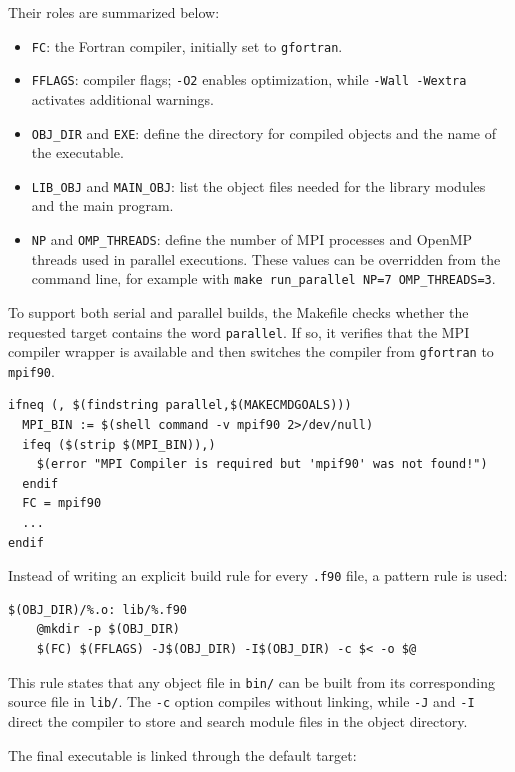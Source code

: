 Their roles are summarized below:

\begin{itemize}
  \item \texttt{FC}: the Fortran compiler, initially set to \texttt{gfortran}.
  \item \texttt{FFLAGS}: compiler flags; \texttt{-O2} enables optimization, while \texttt{-Wall -Wextra} activates additional warnings.
  \item \texttt{OBJ\_DIR} and \texttt{EXE}: define the directory for compiled objects and the name of the executable.
  \item \texttt{LIB\_OBJ} and \texttt{MAIN\_OBJ}: list the object files needed for the library modules and the main program.
  \item \texttt{NP} and \texttt{OMP\_THREADS}: define the number of MPI processes and OpenMP threads used in parallel executions. These values can be overridden from the command line, for example with \texttt{make run\_parallel NP=7 OMP\_THREADS=3}.
\end{itemize}

To support both serial and parallel builds, the Makefile checks whether the requested target contains the word \texttt{parallel}. If so, it verifies that the MPI compiler wrapper is available and then switches the compiler from \texttt{gfortran} to \texttt{mpif90}.

\begin{verbatim}
ifneq (, $(findstring parallel,$(MAKECMDGOALS)))
  MPI_BIN := $(shell command -v mpif90 2>/dev/null)
  ifeq ($(strip $(MPI_BIN)),)
    $(error "MPI Compiler is required but 'mpif90' was not found!")
  endif
  FC = mpif90
  ...
endif
\end{verbatim}

Instead of writing an explicit build rule for every \texttt{.f90} file, a pattern rule is used:

\begin{verbatim}
$(OBJ_DIR)/%.o: lib/%.f90
    @mkdir -p $(OBJ_DIR)
    $(FC) $(FFLAGS) -J$(OBJ_DIR) -I$(OBJ_DIR) -c $< -o $@
\end{verbatim}

This rule states that any object file in \texttt{bin/} can be built from its corresponding source file in \texttt{lib/}. The \texttt{-c} option compiles without linking, while \texttt{-J} and \texttt{-I} direct the compiler to store and search module files in the object directory.

The final executable is linked through the default target:

